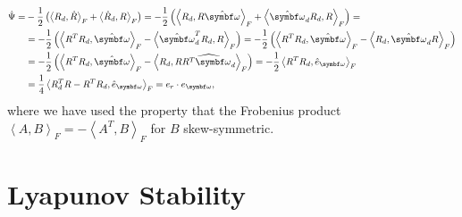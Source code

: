 \begin{equation}
  \begin{aligned}
    \dot \Psi = & -\frac{1}{2} \left( \left\langle R_d, \dot R \right\rangle_F + \left\langle \dot R_d, R \right\rangle_F \right) = - \frac{1}{2} \left( \left\langle R_d , R \hat \bomega \right\rangle_F + \left\langle \hat \bomega_d R_d , R \right\rangle_F \right) =                             \\
                & = - \frac{1}{2} \left( \left\langle R^T R_d , \hat \bomega \right\rangle_F - \left\langle \hat \bomega_d^T R_d , R \right\rangle_F \right) = - \frac{1}{2} \left( \left\langle R^T R_d , \hat \bomega \right\rangle_F - \left\langle  R_d , \hat \bomega_d R \right\rangle_F \right) \\
                & = - \frac{1}{2} \left( \left\langle R^T R_d , \hat \bomega \right\rangle_F - \left\langle  R_d , R \widehat {R^T\bomega_d} \right\rangle_F \right) = - \frac{1}{2} \left\langle R^T R_d , \hat e_\bomega \right\rangle_F                         \\
                & = \frac{1}{4} \left\langle R_d^T R - R^T R_d, \hat e_\bomega \right\rangle_F = e_r \cdot e_\bomega,
  \end{aligned}
\end{equation}
where we have used the property that the Frobenius product $\left\langle A, B \right\rangle_F = - \left\langle A^T, B \right\rangle_F$ for $B$ skew-symmetric.



\section{Lyapunov Stability}

